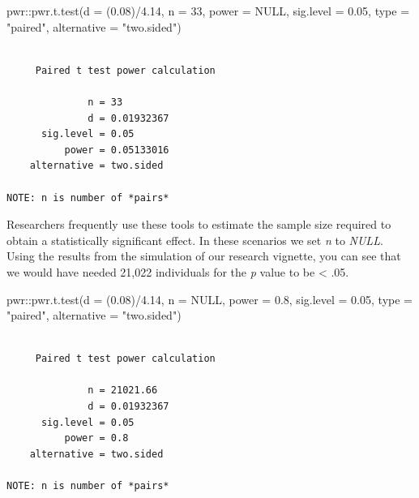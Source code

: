 \documentclass[
  11pt,
]{book}
\newenvironment{Shaded}{\begin{snugshade}}{\end{snugshade}}
\newcommand{\AttributeTok}[1]{\textcolor[rgb]{0.77,0.63,0.00}{#1}}
\newcommand{\ConstantTok}[1]{\textcolor[rgb]{0.00,0.00,0.00}{#1}}
\newcommand{\DecValTok}[1]{\textcolor[rgb]{0.00,0.00,0.81}{#1}}
\newcommand{\FloatTok}[1]{\textcolor[rgb]{0.00,0.00,0.81}{#1}}
\newcommand{\FunctionTok}[1]{\textcolor[rgb]{0.00,0.00,0.00}{#1}}
\newcommand{\NormalTok}[1]{#1}
\newcommand{\SpecialCharTok}[1]{\textcolor[rgb]{0.00,0.00,0.00}{#1}}
\newcommand{\StringTok}[1]{\textcolor[rgb]{0.31,0.60,0.02}{#1}}
\begin{document}
\begin{Shaded}
\begin{Highlighting}[]
\NormalTok{pwr}\SpecialCharTok{::}\FunctionTok{pwr.t.test}\NormalTok{(}\AttributeTok{d =}\NormalTok{ (}\FloatTok{0.08}\NormalTok{)}\SpecialCharTok{/}\FloatTok{4.14}\NormalTok{, }\AttributeTok{n =} \DecValTok{33}\NormalTok{, }\AttributeTok{power =} \ConstantTok{NULL}\NormalTok{, }\AttributeTok{sig.level =} \FloatTok{0.05}\NormalTok{,}
    \AttributeTok{type =} \StringTok{"paired"}\NormalTok{, }\AttributeTok{alternative =} \StringTok{"two.sided"}\NormalTok{)}
\end{Highlighting}
\end{Shaded}

\begin{verbatim}

     Paired t test power calculation 

              n = 33
              d = 0.01932367
      sig.level = 0.05
          power = 0.05133016
    alternative = two.sided

NOTE: n is number of *pairs*
\end{verbatim}

Researchers frequently use these tools to estimate the sample size required to obtain a statistically significant effect. In these scenarios we set \emph{n} to \emph{NULL}. Using the results from the simulation of our research vignette, you can see that we would have needed 21,022 individuals for the \emph{p} value to be \textless{} .05.

\begin{Shaded}
\begin{Highlighting}[]
\NormalTok{pwr}\SpecialCharTok{::}\FunctionTok{pwr.t.test}\NormalTok{(}\AttributeTok{d =}\NormalTok{ (}\FloatTok{0.08}\NormalTok{)}\SpecialCharTok{/}\FloatTok{4.14}\NormalTok{, }\AttributeTok{n =} \ConstantTok{NULL}\NormalTok{, }\AttributeTok{power =} \FloatTok{0.8}\NormalTok{, }\AttributeTok{sig.level =} \FloatTok{0.05}\NormalTok{,}
    \AttributeTok{type =} \StringTok{"paired"}\NormalTok{, }\AttributeTok{alternative =} \StringTok{"two.sided"}\NormalTok{)}
\end{Highlighting}
\end{Shaded}

\begin{verbatim}

     Paired t test power calculation 

              n = 21021.66
              d = 0.01932367
      sig.level = 0.05
          power = 0.8
    alternative = two.sided

NOTE: n is number of *pairs*
\end{verbatim}
\end{document}
